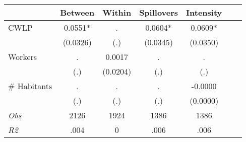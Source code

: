 \begin{tabular}{l*{6}{c}}\hline&\multicolumn{1}{c}{Between}&\multicolumn{1}{c}{Within}&\multicolumn{1}{c}{Spillovers}&\multicolumn{1}{c}{Intensity}\\ \hline 
CWLP & 0.0551* & . & 0.0604* & 0.0609* \\
 & (0.0326) & (.) & (0.0345) & (0.0350) \\
Workers & . & 0.0017 & . & . \\
 & (.) & (0.0204) & (.) & (.) \\
\# Habitants & . & . & . & -0.0000 \\
  & (.) & (.) & (.) & (0.0000) \\
\hline \textit{Obs} & 2126 & 1924 & 1386 & 1386  \\ \textit{R2} & .004 & 0 & .006 & .006 \\ \hline \end{tabular}
